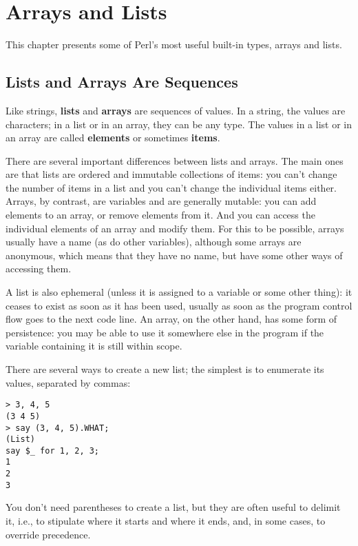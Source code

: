 

\chapter{Arrays and Lists}
\label{arrays}

This chapter presents some of Perl's most useful built-in types, 
arrays and lists.


\section{Lists and Arrays Are Sequences}
\label{sequence}

Like strings, {\bf lists} and {\bf arrays} are sequences of 
values.  In a string, the values are characters; in a list or
in an array, they can be any type.  The values in a list or 
in an array are called {\bf elements} or sometimes {\bf items}.

There are several important differences between lists and arrays. The main ones 
are that lists are ordered and immutable collections of items: 
you can't change the number of items in a list and you can't 
change the individual items either. Arrays, by contrast, are 
variables and are generally mutable: you can add elements 
to an array, or remove elements from it. And you can access 
the individual elements of an array and modify them. For this 
to be possible, arrays usually have a name (as do other variables), 
although some arrays are anonymous, which means that they 
have no name, but have some other ways of accessing them.

A list is also ephemeral (unless it is assigned 
to a variable or some other thing): it ceases to exist as 
soon as it has been used, usually as soon as the program 
control flow goes to the next code line. An array, on the 
other hand, has some form of persistence: you may be able to 
use it somewhere else in the program if the variable 
containing it is still within scope.

There are several ways to create a new list; the simplest is 
to enumerate its values, separated by commas:

\begin{verbatim}
> 3, 4, 5
(3 4 5)
> say (3, 4, 5).WHAT;
(List)
say $_ for 1, 2, 3;
1
2
3
\end{verbatim}
%

You don't need parentheses to create a list, but they are 
often useful to delimit it, i.e., to stipulate where 
it starts and where it ends, and, in some cases, to override 
precedence.

